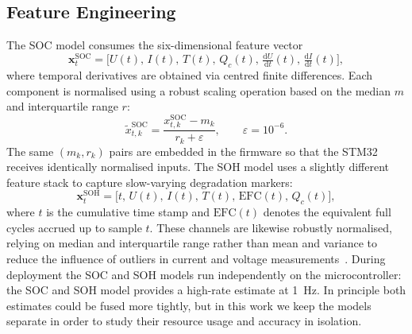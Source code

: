 \documentclass[review]{elsarticle}
\begin{document}
\subsection{Feature Engineering}
The SOC model consumes the six-dimensional feature vector
\begin{equation}
    \mathbf{x}^{\mathrm{SOC}}_t = \bigl[U(t),\, I(t),\, T(t),\, Q_c(t),\, \tfrac{\mathrm{d}U}{\mathrm{d}t}(t),\, \tfrac{\mathrm{d}I}{\mathrm{d}t}(t)\bigr],
\end{equation}
where temporal derivatives are obtained via centred finite differences. Each component is normalised using a robust scaling operation based on the median $m$ and interquartile range $r$: 
\begin{equation}
    \tilde{x}^{\mathrm{SOC}}_{t,k} = \frac{x^{\mathrm{SOC}}_{t,k} - m_k}{r_k + \varepsilon}, \qquad \varepsilon=10^{-6}.
\end{equation}
The same $(m_k,r_k)$ pairs are embedded in the firmware so that the STM32 receives identically normalised inputs. 
The SOH model uses a slightly different feature stack to capture slow-varying degradation markers:
\begin{equation}
    \mathbf{x}^{\mathrm{SOH}}_t = \bigl[ t,\, U(t),\, I(t),\, T(t),\, \mathrm{EFC}(t),\, Q_c(t) \bigr],
\end{equation}
where $t$ is the cumulative time stamp and $\mathrm{EFC}(t)$ denotes the equivalent full cycles accrued up to sample $t$. These channels are likewise robustly normalised, relying on median and interquartile range rather than mean and variance to reduce the influence of outliers in current and voltage measurements~\cite{huberRobustStatistics2009,pedregosaScikitlearnMachineLearning2012}. During deployment the SOC and SOH models run independently on the microcontroller: the SOC and SOH model provides a high-rate estimate at 1~Hz. In principle both estimates could be fused more tightly, but in this work we keep the models separate in order to study their resource usage and accuracy in isolation.
\end{document}
